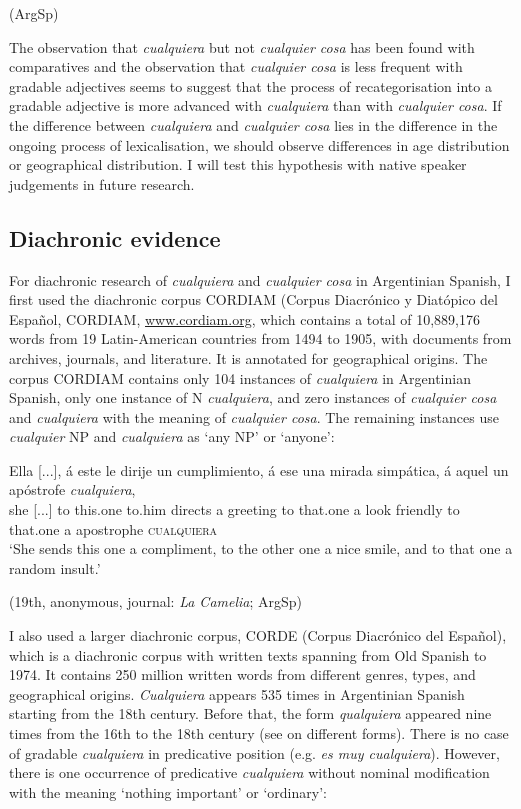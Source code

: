 (ArgSp)
\z


The observation that \textit{cualquiera} but not \textit{cualquier cosa} has been found with comparatives and the observation that \textit{cualquier cosa} is less frequent with gradable adjectives seems to suggest that the process of recategorisation into a gradable adjective is more advanced with \textit{cualquiera} than with \textit{cualquier cosa}. If the difference between \textit{cualquiera} and \textit{cualquier cosa} lies in the difference in the ongoing process of lexicalisation, we should observe differences in age distribution or geographical distribution. I will test this hypothesis with native speaker judgements in future research.

\subsection{{Diachronic} {evidence}} \label{sec:4.6.3}

For diachronic research of \textit{cualquiera} and \textit{cualquier cosa} in Argentinian Spanish, I first used the diachronic corpus CORDIAM (Corpus Diacrónico y Diatópico del Español, CORDIAM, \href{http://www.cordiam.org}{www.cordiam.org}, which contains a total of 10,889,176 words from 19 Latin-American countries from 1494 to 1905, with documents from archives, journals, and literature. It is annotated for geographical origins. The corpus CORDIAM contains only 104 instances of \textit{cualquiera} in Argentinian Spanish, only one instance of N \textit{cualquiera}, and zero instances of \textit{cualquier cosa} and \textit{cualquiera} with the meaning of \textit{cualquier cosa}. The remaining instances use \textit{cualquier} NP and \textit{cualquiera} as ‘any NP’ or ‘anyone’:

\ea \label{ex:key:269} %
    \gll Ella [...], á este le dirije un cumplimiento, á ese una mirada simpática, á aquel un apóstrofe \textit{cualquiera},\\
she [...] to this.one to.him directs a greeting to that.one a look friendly to that.one a apostrophe \textsc{cualquiera}\\
    \glt ‘She sends this one a compliment, to the other one a nice smile, and to that one a random insult.’

{    (19}{{th}}{, anonymous, journal:} {\textit{La Camelia}}{; ArgSp)}
\z

I also used a larger diachronic corpus, CORDE (Corpus Diacrónico del Español), which is a diachronic corpus with written texts spanning from Old Spanish to 1974. It contains 250 million written words from different genres, types, and geographical origins. \textit{Cualquiera} appears 535 times in Argentinian Spanish starting from the 18th century. Before that, the form \textit{qualquiera} appeared nine times from the 16th to the 18th century (see  on different forms). There is no case of gradable \textit{cualquiera} in predicative position (e.g. \textit{es muy cualquiera}). However, there is one occurrence of predicative \textit{cualquiera} without nominal modification with the meaning ‘nothing important’ or ‘ordinary’:

